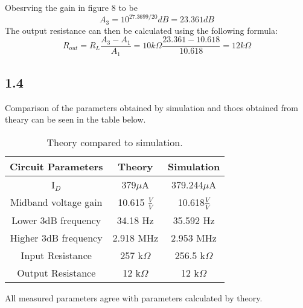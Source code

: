 Obesrving the gain in figure 8 to be $$A_3 = 10^{27.3699/20} dB = 23.361 dB$$
The output resistance can then be calculated using the following formula: 
$$R_{out} = R_L\frac{A_3 - A_1}{A_1} = 10k\Omega \frac{23.361-10.618}{10.618} = 12 k\Omega$$

\pagebreak
\subsection*{1.4}

  Comparison of the parameters obtained by simulation and thoes obtained from theary can be seen in the table below.\\

  \begin{table}[htbp]
     \centering
       \begin{tabular}{ c | c | c }
        \hline
         Circuit Parameters     &   Theory                  & Simulation \\
       \hline
        I$_D$                   &   379$\mu$A               &   379.244$\mu$A\\
        Midband voltage gain    &   10.615 $\frac{V}{V}$    &   10.618$\frac{V}{V}$\\
        Lower 3dB frequency     &   34.18 Hz                &   35.592 Hz\\
        Higher 3dB frequency    &   2.918 MHz               &   2.953 MHz\\
        Input Resistance        &   257 k$\Omega$           &   256.5 k$\Omega$\\
        Output Resistance       &   12 k$\Omega$            &   12 k$\Omega$\\
       \end{tabular}%
     \caption{Theory compared to simulation.}
     \label{tab:addlabel}%
    \end{table}%
  
  All measured parameters agree with parameters calculated by theory.